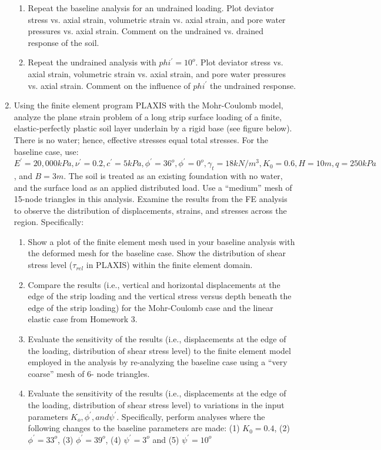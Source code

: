 \documentclass[a4paper,12pt]{article}
\begin{document}
\begin{enumerate}
\begin{enumerate}
		\item Repeat the baseline analysis for an undrained loading. Plot deviator stress vs. axial strain, volumetric strain vs. axial strain, and pore water pressures vs. axial strain. Comment on the undrained vs. drained response of the soil.
		\item Repeat the undrained analysis with $phi^\prime = 10^o$. Plot deviator stress vs. axial strain,
		volumetric strain vs. axial strain, and pore water pressures vs. axial strain. Comment
		on the influence of $phi^\prime$ the undrained response.
	\end{enumerate}
	
	\item Using the finite element program PLAXIS with the Mohr-Coulomb model, analyze the plane
	strain problem of a long strip surface loading of a finite, elastic-perfectly plastic soil layer
	underlain by a rigid base (see figure below). There is no water; hence, effective stresses
	equal total stresses. For the baseline case, use: $E^\prime = 20,000 kPa, \nu^\prime = 0.2, c^\prime = 5 kPa, \phi^\prime = 36^o, \phi^\prime = 0^o, \gamma_t = 18 kN/m^3, K_0 = 0.6, H = 10m, q = 250 kPa$, and $B = 3 m$.  The soil is treated as an
	existing foundation with no water, and the surface load as an applied distributed load. Use a
	``medium'' mesh of 15-node triangles in this analysis. Examine the results from the FE
	analysis to observe the distribution of displacements, strains, and stresses across the region.	Specifically:
	
	\begin{enumerate}
		\item Show a plot of the finite element mesh used in your baseline analysis with the deformed mesh for the baseline case. Show the
		distribution of shear stress level ($\tau_{rel}$ in PLAXIS) within the finite element domain.
		\item Compare the results (i.e., vertical and horizontal displacements at the edge of the
		strip loading and the vertical stress versus depth beneath the edge of the strip
		loading) for the Mohr-Coulomb case and the linear elastic case from Homework 3.
		\item Evaluate the sensitivity of the results (i.e., displacements at the edge of the
		loading, distribution of shear stress level) to the finite element model employed in
		the analysis by re-analyzing the baseline case using a ``very coarse'' mesh of 6-
		node triangles.
		\item Evaluate the sensitivity of the results (i.e., displacements at the edge of the
		loading, distribution of shear stress level) to variations in the input parameters
		$K_o, \phi^\prime, and \psi^\prime$. Specifically, perform analyses where the following changes to the
		baseline parameters are made: (1) $K_0 = 0.4$, (2) $\phi^\prime = 33^o$, (3) $\phi^\prime = 39^o$, (4) $\psi^\prime = 3^o$ and (5) $\psi^\prime = 10^o$
	\end{enumerate}


\end{enumerate}
\end{document}
